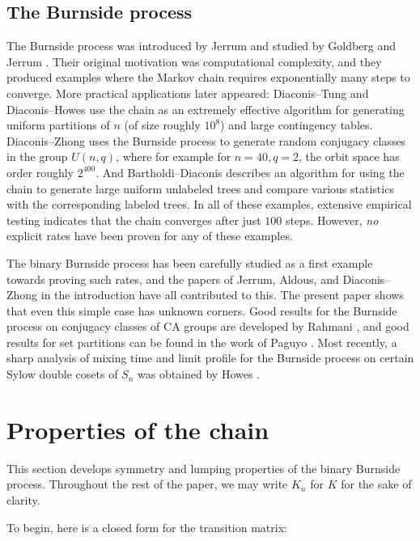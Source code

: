 \documentclass[11pt]{article}
\newcounter{r}
\newcounter{s}
\numberwithin{equation}{section}
\begin{document}
\subsection{The Burnside process}\label{burnsidesubsection}

The Burnside process was introduced by Jerrum \cite{jerrum} and studied by Goldberg and Jerrum \cite{goldbergjerrum}. Their original motivation was computational complexity, and they produced examples where the Markov chain requires exponentially many steps to converge. More practical applications later appeared: Diaconis--Tung \cite{diaconistung} and Diaconis--Howes \cite{contingency} use the chain as an extremely effective algorithm for generating uniform partitions of $n$ (of size roughly $10^8$) and large contingency tables. Diaconis--Zhong \cite{burnsideimportance} uses the Burnside process to generate random conjugacy classes in the group $U(n, q)$, where for example for $n = 40, q = 2$, the orbit space has order roughly $2^{400}$. And Bartholdi--Diaconis \cite{polyatrees} describes an algorithm for using the chain to generate large uniform unlabeled trees and compare various statistics with the corresponding labeled trees. In all of these examples, extensive empirical testing indicates that the chain converges after just $100$ steps. However, \textit{no} explicit rates have been proven for any of these examples.

The binary Burnside process has been carefully studied as a first example towards proving such rates, and the papers of Jerrum, Aldous, and Diaconis--Zhong in the introduction have all contributed to this. The present paper shows that even this simple case has unknown corners. Good results for the Burnside process on conjugacy classes of CA groups are developed by Rahmani \cite{CAgroups}, and good results for set partitions can be found in the work of Paguyo \cite{paguyo}. Most recently, a sharp analysis of mixing time and limit profile for the Burnside process on certain Sylow double cosets of $S_n$ was obtained by Howes \cite{howes}.

\section{Properties of the chain}\label{propertiessection}

This section develops symmetry and lumping properties of the binary Burnside process. Throughout the rest of the paper, we may write $K_n$ for $K$ for the sake of clarity.

To begin, here is a closed form for the transition matrix:
\end{document}
